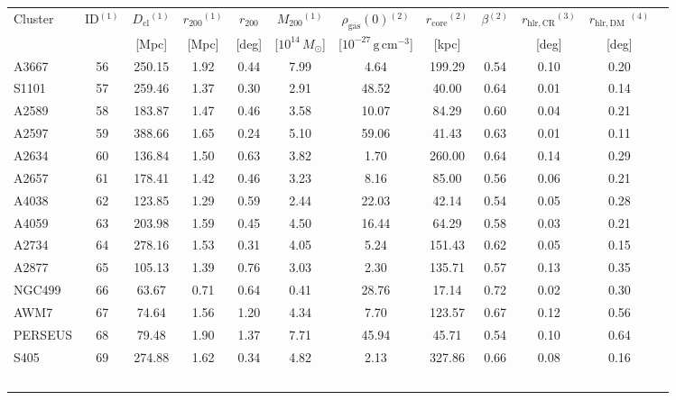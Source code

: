 \documentclass[10pt,aps,pra,reprint,amsmath,amsfonts,amssymb,showpacs,nofootinbib,floatfix]{revtex4-1}
\newcommand{\rmn}{\mathrm}
\newcommand{\clu}{\rmn{cl}}
\newcommand{\msun}{M_\odot}
\newcommand{\rvir}{r_{200}}
\newcommand{\mvir}{M_{200}}
\begin{document}
\newpage
\begin{table}
\begin{minipage}{2.0\columnwidth}
\begin{tabular}{l  c c c c c c c c c c c}
\hline
\hline
Cluster & ID$^{(1)}$ & $D_\clu$$^{(1)}$ & $\rvir$$^{(1)}$ & $\rvir$ & 
$\mvir$$^{(1)}$ & $\rho_\rmn{gas}(0)$$^{(2)}$ & $r_\rmn{core}$$^{(2)}$ & 
$\beta$$^{(2)}$ & $r_\rmn{hlr,CR}$$^{(3)}$ & $r_\rmn{hlr,DM}$  $^{(4)}$ \\
& & [Mpc] & [Mpc] & [deg] & [$10^{14}\,\msun$] & 
[$10^{-27}\,\rmn{g}\,\rmn{cm}^{-3}$] & [kpc] &  & [deg] & [deg] \\
 \hline
A3667    &  56 & 250.15 &   1.92 &   0.44 &   7.99 &   4.64 & 199.29 &   0.54 &   0.10 &   0.20 \\
S1101    &  57 & 259.46 &   1.37 &   0.30 &   2.91 &  48.52 &  40.00 &   0.64 &   0.01 &   0.14 \\
A2589    &  58 & 183.87 &   1.47 &   0.46 &   3.58 &  10.07 &  84.29 &   0.60 &   0.04 &   0.21 \\
A2597    &  59 & 388.66 &   1.65 &   0.24 &   5.10 &  59.06 &  41.43 &   0.63 &   0.01 &   0.11 \\
A2634    &  60 & 136.84 &   1.50 &   0.63 &   3.82 &   1.70 & 260.00 &   0.64 &   0.14 &   0.29 \\
A2657    &  61 & 178.41 &   1.42 &   0.46 &   3.23 &   8.16 &  85.00 &   0.56 &   0.06 &   0.21 \\
A4038    &  62 & 123.85 &   1.29 &   0.59 &   2.44 &  22.03 &  42.14 &   0.54 &   0.05 &   0.28 \\
A4059    &  63 & 203.98 &   1.59 &   0.45 &   4.50 &  16.44 &  64.29 &   0.58 &   0.03 &   0.21 \\
A2734    &  64 & 278.16 &   1.53 &   0.31 &   4.05 &   5.24 & 151.43 &   0.62 &   0.05 &   0.15 \\
A2877    &  65 & 105.13 &   1.39 &   0.76 &   3.03 &   2.30 & 135.71 &   0.57 &   0.13 &   0.35 \\
NGC499   &  66 &  63.67 &   0.71 &   0.64 &   0.41 &  28.76 &  17.14 &   0.72 &   0.02 &   0.30 \\
AWM7     &  67 &  74.64 &   1.56 &   1.20 &   4.34 &   7.70 & 123.57 &   0.67 &   0.12 &   0.56 \\
PERSEUS  &  68 &  79.48 &   1.90 &   1.37 &   7.71 &  45.94 &  45.71 &   0.54 &   0.10 &   0.64 \\
S405     &  69 & 274.88 &   1.62 &   0.34 &   4.82 &   2.13 & 327.86 &   0.66 &   0.08 &   0.16 \\
$$
\end{tabular}
\end{minipage}
\end{table}
\end{document}
